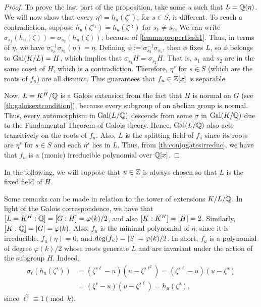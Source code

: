\documentclass[../main.tex]{subfiles}
\begin{document}
\begin{proof}
	To prove the last part of the proposition, take some $u$ such that $L=\mathbb{Q}(\eta)$. We will now show that every $\eta^s=h_u(\zeta^s)$, for $s\in S$, is different. To reach a contradiction, suppose $h_u(\zeta^{s_1})=h_u(\zeta^{s_2})$ for $s_1\neq s_2$. We can write $\sigma_{s_1}(h_u(\zeta))=\sigma_{s_2}(h_u(\zeta))$, because of \cref{lemma:propertiesh1}. Thus, in terms of $\eta$, we have $\sigma_{s_2}^{-1}\sigma_{s_1}(\eta)=\eta$. Defining $\phi:=\sigma_{s_2}^{-1}\sigma_{s_1}$, then $\phi$ fixes $L$, so $\phi$ belongs to $\operatorname{Gal}(K/L)=H$, which implies that $\sigma_{s_1}H=\sigma_{s_2}H$. That is, $s_1$ and $s_2$ are in the same coset of $H$, which is a contradiction. Therefore, $\eta^s$ for $s\in S$ (which are the roots of $f_u$) are all distinct. This guarantees that $f_u\in\mathbb{Z}[x]$ is separable. 

	 Now, $L=K^H/\mathbb{Q}$ is a Galois extension from the fact that $H$ is normal on $G$ (see \cref{th:galoisextcondition}), because every subgroup of an abelian group is normal. Thus, every automorphism in $\operatorname{Gal}(L/\mathbb{Q})$ descends from some $\sigma$ in $\operatorname{Gal}(K/\mathbb{Q})$ due to the Fundamental Theorem of Galois theory. Hence, $\operatorname{Gal}(L/\mathbb{Q})$ also acts transitively on the roots of $f_u$. Also, $L$ is the splitting field of $f_u$ since its roots are $\eta^s$ for $s\in S$ and each $\eta^s$ lies in $L$. Thus, from \cref{th:conjugatesirreduc}, we have that $f_u$ is a (monic) irreducible polynomial over $\mathbb{Q}[x]$.
\end{proof}

In the following, we will suppose that $u\in \mathbb{Z}$ is always chosen so that $L$ is the fixed field of $H$.

\begin{remark}\label{remark:minpoleta}
Some remarks can be made in relation to the tower of extensions $K/L/\mathbb{Q}$. In light of the Galois correspondence, we have that $[L=K^H:\mathbb{Q}]=[G:H]=\varphi(k)/2$, and also $[K:K^H]=\abs{H}=2$. Similarly, $[K:\mathbb{Q}]=\abs{G}=\varphi(k)$. Also, $f_u$ is the minimal polynomial of $\eta$, since it is irreducible, $f_u(\eta)=0$, and $\operatorname{deg}(f_u)=\abs{S}=\varphi(k)/2$. In short, $f_u$ is a polynomial of degree $\varphi(k)/2$ whose roots generate $L$ and are invariant under the action of the subgroup $H$. Indeed,
 \begin{align*}
 	\sigma_\ell(h_u(\zeta^s))&=(\zeta^{s\ell}-u)(u-\zeta^{s\ell^2})=(\zeta^{s\ell}-u)(u-\zeta^{s})\\
 	&=(\zeta^{s}-u)(u-\zeta^{s\ell})=h_u(\zeta^s),
 \end{align*}
 since $\ell^2\equiv 1 \pmod{k}$.
\end{remark}
\end{document}
